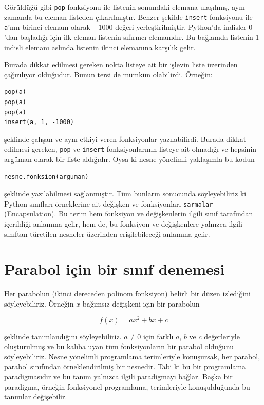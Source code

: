 \documentclass[12pt]{report}
\begin{document}
Görüldüğü gibi \texttt{pop} fonksiyonu ile listenin sonundaki elemana ulaşılmış, aynı zamanda bu eleman listeden çıkarılmıştır. Benzer şekilde \texttt{insert} fonksiyonu ile \texttt{a}'nın birinci elemanı olarak $-1000$ değeri yerleştirilmiştir. Python'da indisler $0$'dan başladığı için ilk eleman listenin sıfırıncı elemanıdır. Bu bağlamda listenin 1 indisli elemanı aslında listenin ikinci elemanına karşılık gelir.

Burada dikkat edilmesi gereken nokta listeye ait bir işlevin liste üzerinden çağırılıyor olduğudur. Bunun tersi de mümkün olabilirdi. Örneğin:


\begin{Verbatim}[frame = single]
pop(a)
pop(a)
pop(a)
insert(a, 1, -1000)
\end{Verbatim}

şeklinde çalışan ve aynı etkiyi veren fonksiyonlar yazılabilirdi. Burada dikkat edilmesi gereken, \texttt{pop} ve \texttt{insert} fonksiyonlarının listeye ait olmadığı ve hepsinin argüman olarak bir liste aldığıdır. Oysa ki nesne yönelimli yaklaşımla bu kodun

\begin{Verbatim}[frame = single]
nesne.fonksion(arguman)
\end{Verbatim}

şeklinde yazılabilmesi sağlanmıştır. Tüm bunların sonucunda söyleyebiliriz ki Python sınıfları örneklerine ait değişken ve fonksiyonları \texttt{sarmalar} (Encapsulation). Bu terim hem fonksiyon ve değişkenlerin ilgili sınıf tarafından içerildiği anlamına gelir, hem de, bu fonksiyon ve değişkenlere yalnızca ilgili sınıftan türetilen nesneler üzerinden erişilebileceği anlamına gelir. 


\pagebreak
\section{Parabol için bir sınıf denemesi}
Her parabolun (ikinci dereceden polinom fonksiyon) belirli bir düzen izlediğini söyleyebiliriz. Örneğin $x$ bağımsız değişkeni için bir parabolun 

$$
f(x) = ax^2 + bx + c
$$

şeklinde tanımlandığını söyleyebiliriz. $a \ne 0$ için farklı $a$, $b$ ve $c$ değerleriyle oluşturulmuş ve bu kalıba uyan tüm fonksiyonların bir parabol olduğunu söyleyebiliriz. Nesne yönelimli programlama terimleriyle konuşursak, her parabol, parabol sınıfından örneklendirilmiş bir nesnedir. Tabi ki bu bir programlama paradigmasıdır ve bu tanım yalnızca ilgili paradigmayı bağlar. Başka bir paradigma, örneğin fonksiyonel programlama, terimleriyle konuşulduğunda bu tanımlar değişebilir.
\end{document}
